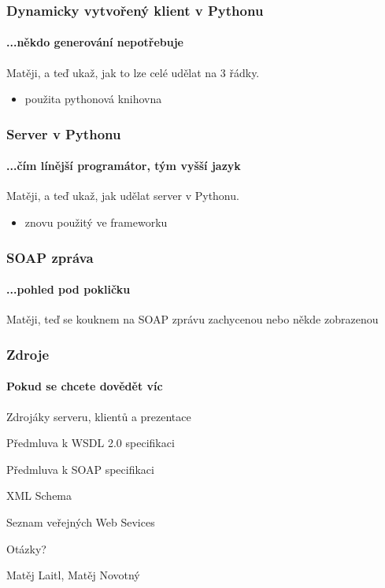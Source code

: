 \documentclass[12pt]{beamer}
\begin{document}
\begin{frame}
  \frametitle{Dynamicky vytvořený klient v Pythonu}
  \framesubtitle{...někdo generování nepotřebuje}

  \begin{example}
    Matěji, a teď ukaž, jak to lze celé udělat na 3 řádky.
    \begin{itemize}
      \item použita pythonová knihovna 
    \end{itemize}
  \end{example}
\end{frame}

\begin{frame}
  \frametitle{Server v Pythonu}
  \framesubtitle{...čím línější programátor, tým vyšší jazyk}

  \begin{example}
    Matěji, a teď ukaž, jak udělat server v Pythonu.
    \begin{itemize}
      \item znovu  použitý ve frameworku 
    \end{itemize}
  \end{example}
\end{frame}

\begin{frame}
  \frametitle{SOAP zpráva}
  \framesubtitle{...pohled pod pokličku}

  \begin{example}
    Matěji, teď se kouknem na SOAP zprávu zachycenou nebo někde zobrazenou
  \end{example}
\end{frame}

\begin{frame}
  \frametitle{Zdroje}
  \framesubtitle{Pokud se chcete dovědět víc}
  \begin{thebibliography}{10}

  \beamertemplatearticlebibitems

    Zdrojáky serveru, klientů a prezentace

    Předmluva k WSDL 2.0 specifikaci

    Předmluva k SOAP specifikaci

    XML Schema

    Seznam veřejných Web Sevices

  \end{thebibliography}
\end{frame}

\begin{frame}
  \vspace{2cm}
  {\huge Otázky?}

  \vspace{3cm}
  \begin{flushright}
    Matěj Laitl, Matěj Novotný

  \end{flushright}
\end{frame}
\end{document}
